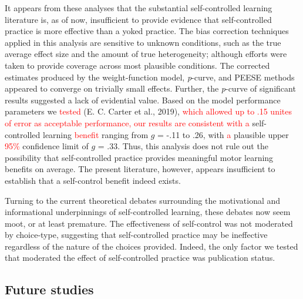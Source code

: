 \documentclass[
  english,
  man,floatsintext]{apa7}
\begin{document}
It appears from these analyses that the substantial self-controlled learning literature is, as of now, insufficient to provide evidence that self-controlled practice is more effective than a yoked practice. The bias correction techniques applied in this analysis are sensitive to unknown conditions, such as the true average effect size and the amount of true heterogeneity; although efforts were taken to provide coverage across most plausible conditions. The corrected estimates produced by the weight-function model, \emph{p}-curve, and PEESE methods appeared to converge on trivially small effects. Further, the \emph{p}-curve of significant results suggested a lack of evidential value. Based on the model performance parameters we \textcolor{red}{tested} (E. C. Carter et al., 2019), \textcolor{red}{which allowed up to .15 unites of error as acceptable performance, our results are consistent with a} self-controlled learning \textcolor{red}{benefit} ranging from \(g\) = -.11 to .26, with \textcolor{red}{a} plausible upper \textcolor{red}{95\%} confidence limit of \(g\) = .33. Thus, this analysis does not rule out the possibility that self-controlled practice provides meaningful motor learning benefits on average. The present literature, however, appears insufficient to establish that a self-control benefit indeed exists.

Turning to the current theoretical debates surrounding the motivational and informational underpinnings of self-controlled learning, these debates now seem moot, or at least premature. The effectiveness of self-control was not moderated by choice-type, suggesting that self-controlled practice may be ineffective regardless of the nature of the choices provided. Indeed, the only factor we tested that moderated the effect of self-controlled practice was publication status.

\hypertarget{future-studies}{%
\subsection{Future studies}\label{future-studies}}
\end{document}
